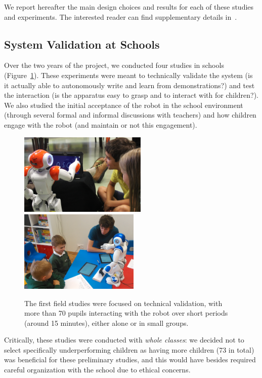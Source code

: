 \documentclass{article}
\begin{document}
We report hereafter the main design choices and results for each of these
studies and experiments. The interested reader can find supplementary details
in~\cite{jacq2016building, hood2015when}.

\subsection{System Validation at Schools}

Over the two years of the project, we conducted four studies in schools
(Figure~\ref{fig:schools}). These experiments were meant to technically validate
the system (is it actually able to autonomously write and learn from
demonstrations?) and test the interaction (is the apparatus easy to grasp and to
interact with for children?). We also studied the initial acceptance of the
robot in the school environment (through several formal and informal discussions
with teachers) and how children engage with the robot (and maintain or not this
engagement).

\begin{figure}
    \centering
    \includegraphics[height=3.9cm]{schools}
    \includegraphics[height=3.9cm]{schools2}
    \caption{\small The first field studies were focused on technical validation, with
    more than 70 pupils interacting with the robot over short periods (around 15
minutes), either alone or in small groups.}
    \label{fig:schools}
\end{figure}

Critically, these studies were conducted with \emph{whole classes}: we decided
not to select specifically underperforming children as having more children (73
in total) was beneficial for these preliminary studies, and this would have
besides required careful organization with the school due to ethical concerns.
\end{document}
